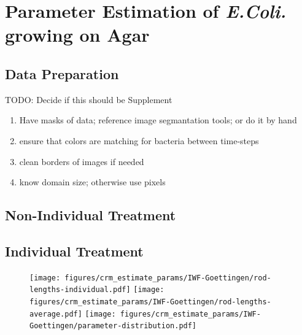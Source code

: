 \documentclass{article}
\begin{document}
\section{Parameter Estimation of \textit{E.Coli.} growing on Agar}
\subsection{Data Preparation}
TODO: Decide if this should be Supplement
\begin{enumerate}
    \item Have masks of data; reference image segmantation tools; or do it by hand
    \item ensure that colors are matching for bacteria between time-steps
    \item clean borders of images if needed
    \item know domain size; otherwise use pixels
\end{enumerate}

\subsection{Non-Individual Treatment}
\subsection{Individual Treatment}
\label{subsec:parameter-estimation-individual-treatment}
\begin{figure}[H]
    \centering
    \texttt{[image: figures/crm\_estimate\_params/IWF-Goettingen/rod-lengths-individual.pdf]}%
    \texttt{[image: figures/crm\_estimate\_params/IWF-Goettingen/rod-lengths-average.pdf]}%
    \texttt{[image: figures/crm\_estimate\_params/IWF-Goettingen/parameter-distribution.pdf]}%
    \caption{}
    \label{fig:estimated-growth-rates}
\end{figure}
\end{document}
